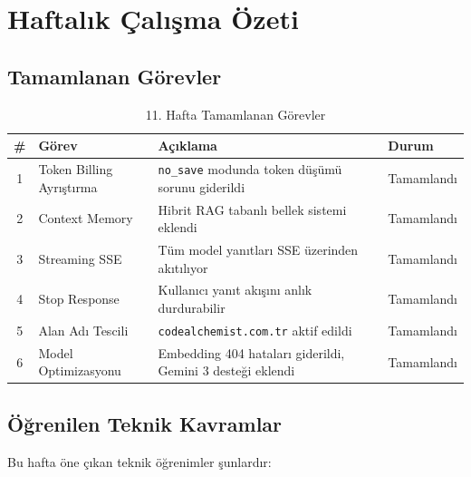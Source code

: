 \documentclass[12pt,a4paper]{article}
\begin{document}
\section{Haftalık Çalışma Özeti}

\subsection{Tamamlanan Görevler}

\begin{table}[H]
\centering
\caption{11. Hafta Tamamlanan Görevler}
\begin{tabularx}{\textwidth}{@{} c l X l @{}}
\toprule
\textbf{\#} & \textbf{Görev} & \textbf{Açıklama} & \textbf{Durum} \\
\midrule
1 & Token Billing Ayrıştırma & \texttt{no\_save} modunda token düşümü sorunu giderildi & \textcolor{codegreen}{Tamamlandı} \\
2 & Context Memory & Hibrit RAG tabanlı bellek sistemi eklendi & \textcolor{codegreen}{Tamamlandı} \\
3 & Streaming SSE & Tüm model yanıtları SSE üzerinden akıtılıyor & \textcolor{codegreen}{Tamamlandı} \\
4 & Stop Response & Kullanıcı yanıt akışını anlık durdurabilir & \textcolor{codegreen}{Tamamlandı} \\
5 & Alan Adı Tescili & \texttt{codealchemist.com.tr} aktif edildi & \textcolor{codegreen}{Tamamlandı} \\
6 & Model Optimizasyonu & Embedding 404 hataları giderildi, Gemini 3 desteği eklendi & \textcolor{codegreen}{Tamamlandı} \\
\bottomrule
\end{tabularx}
\end{table}

\subsection{Öğrenilen Teknik Kavramlar}

Bu hafta öne çıkan teknik öğrenimler şunlardır:
\end{document}
